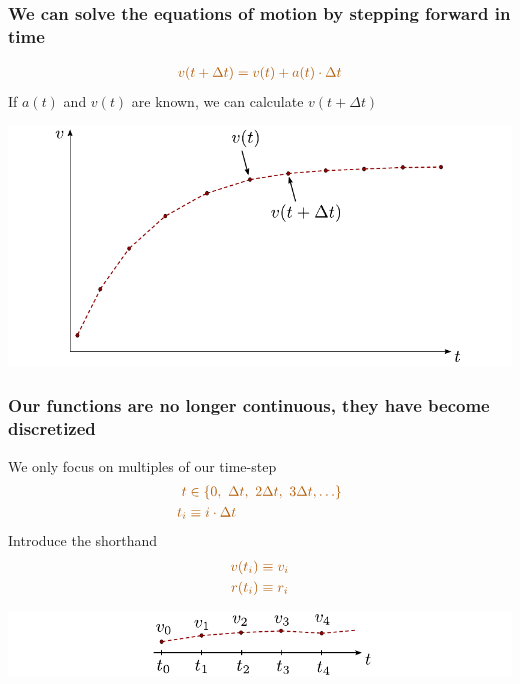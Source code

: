 \documentclass[english, 12pt]{beamer}
\newcommand{\alrt}{\color{AlertColor}}
\begin{document}
\begin{frame}[fragile]
\frametitle{We can solve the equations of motion by stepping forward in time}

\begin{align*}
\alrt v(t+\Delta t) = v(t) + a(t)\cdot \Delta t
\end{align*}
 {	
If $a(t)$ and $v(t)$ are known, we can calculate $v(t+\Delta t)$
}

 {
\vspace{-0.2cm}
\begin{center}
\includegraphics[width=\textwidth]{fig/eulers0.pdf}
\end{center}
}
\end{frame}

\begin{frame}[fragile]
\frametitle{Our functions are no longer continuous, they have become discretized}

 {	
We only focus on multiples of our time-step
\begin{align*}
\alrt t & \alrt \in \{ 0,\ \Delta t,\  2\Delta t, \ 3\Delta t,  \ldots \} \\
\alrt t_i & \alrt \equiv i\cdot\Delta t
\end{align*}
}
 {	
Introduce the shorthand
\begin{align*}
\alrt v(t_i) &\alrt \equiv v_i \\
\alrt r(t_i) &\alrt \equiv r_i \\
\end{align*}
}

 {
 \vspace{-0.4cm}
\begin{center}
\includegraphics[width=\textwidth]{fig/time_discretization.pdf}
\end{center}
 \vspace{0.8cm}
}
\end{frame}
\end{document}
